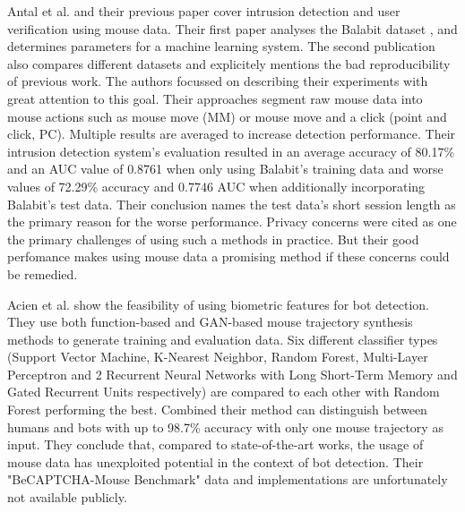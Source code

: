 \documentclass[
    fontsize=12pt,
    headings=small,
    parskip=half,           %
    bibliography=totoc,
    numbers=noenddot,       %
    open=any,               %
    final                   %
]{scrreprt}
\begin{document}
Antal et al.\cite{9111596} and their previous paper \cite{https://doi.org/10.1049/iet-bmt.2018.5126} cover intrusion detection and user verification using mouse data. Their first paper analyses the Balabit dataset \cite{BALABIT_CHALLENGE}, and determines parameters for a machine learning system. The second publication also compares different datasets and explicitely mentions the bad reproducibility of previous work. The authors focussed on describing their experiments with great attention to this goal. Their approaches segment raw mouse data into mouse actions such as mouse move (MM) or mouse move and a click (point and click, PC). Multiple results are averaged to increase detection performance. Their intrusion detection system's evaluation resulted in an average accuracy of 80.17\% and an AUC value of 0.8761 when only using Balabit's training data and worse values of 72.29\% accuracy and 0.7746 AUC when additionally incorporating Balabit's test data. Their conclusion names the test data's short session length as the primary reason for the worse performance. Privacy concerns were cited as one the primary challenges of using such a methods in practice. But their good perfomance makes using mouse data a promising method if these concerns could be remedied.

Acien et al. \cite{Acien2020BeCAPTCHAMouseSM} show the feasibility of using biometric features for bot detection. They use both function-based and GAN-based mouse trajectory synthesis methods to generate training and evaluation data. Six different classifier types (Support Vector Machine, K-Nearest Neighbor, Random Forest, Multi-Layer Perceptron and 2 Recurrent Neural Networks with Long Short-Term Memory and Gated Recurrent Units respectively) are compared to each other with Random Forest performing the best. Combined their method can distinguish between humans and bots with up to 98.7\% accuracy with only one mouse trajectory as input. They conclude that, compared to state-of-the-art works, the usage of mouse data has unexploited potential in the context of bot detection. Their "BeCAPTCHA-Mouse Benchmark" data and implementations are unfortunately not available publicly.
\end{document}
